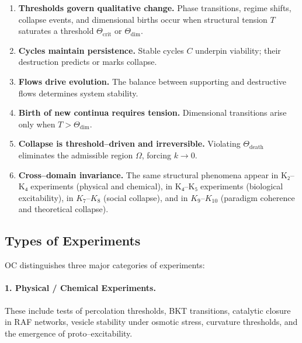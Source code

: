 \begin{enumerate}
    \item \textbf{Thresholds govern qualitative change.}  
          Phase transitions, regime shifts, collapse events, and dimensional
          births occur when structural tension $T$ saturates a threshold
          $\Theta_{\mathrm{crit}}$ or $\Theta_{\mathrm{dim}}$.

    \item \textbf{Cycles maintain persistence.}  
          Stable cycles $C$ underpin viability; their destruction predicts or
          marks collapse.

    \item \textbf{Flows drive evolution.}  
          The balance between supporting and destructive flows determines
          system stability.

    \item \textbf{Birth of new continua requires tension.}  
          Dimensional transitions arise only when $T > \Theta_{\mathrm{dim}}$.

    \item \textbf{Collapse is threshold–driven and irreversible.}  
          Violating $\Theta_{\mathrm{death}}$ eliminates the admissible region
          $\Omega$, forcing $k\to 0$.

    \item \textbf{Cross–domain invariance.}  
          The same structural phenomena appear in K₂–K₄ experiments (physical
          and chemical), in K₄–K₅ experiments (biological excitability), in
          $K_7$–$K_8$ (social collapse), and in $K_9$–$K_{10}$ (paradigm coherence and
          theoretical collapse).
\end{enumerate}


\subsection{Types of Experiments}

OC distinguishes three major categories of experiments:

\paragraph{1. Physical / Chemical Experiments.}  
These include tests of percolation thresholds, BKT transitions, catalytic
closure in RAF networks, vesicle stability under osmotic stress, curvature
thresholds, and the emergence of proto–excitability.

